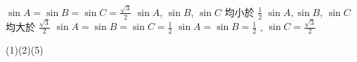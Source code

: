 \begin{QUESTIONS}
\begin{QUESTION}
\begin{QBODY}
\begin{QOPS}
                \QOP $\sin A=\sin B= \sin C= \frac{\sqrt{3}}{2}$ 
                \QOP $\sin A$, $\sin B$, $\sin C$ 均小於 $\frac{1}{2}$ 
                \QOP $\sin A, \sin B$, $\sin C$ 均大於 $\frac{\sqrt{3}}{2}$ 
                \QOP $\sin A = \sin B = \sin C =\frac{1}{2}$ 
                \QOP $\sin A= \sin B= \frac{1}{2}$ , $\sin C= \frac{\sqrt{3}}{2}$
            \end{QOPS}
        \end{QBODY}
        \begin{QFROMS}
        \end{QFROMS}
        \begin{QTAGS}\end{QTAGS}
        \begin{QANS}
            (1)(2)(5)
        \end{QANS}
        \begin{QSOLLIST}
        \end{QSOLLIST}
        \begin{QEMPTYSPACE}
        \end{QEMPTYSPACE}
    \end{QUESTION}
\end{QUESTIONS}
